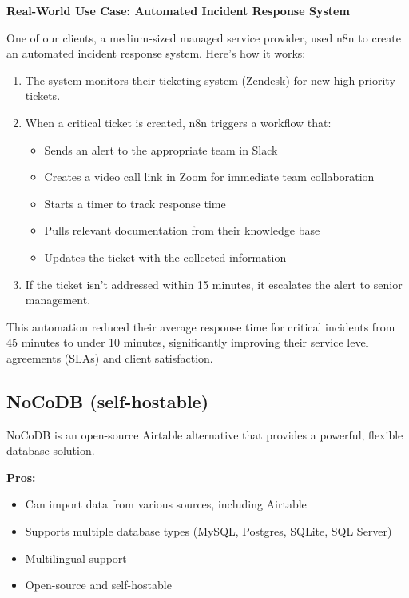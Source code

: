 \textbf{Real-World Use Case: Automated Incident Response System}

One of our clients, a medium-sized managed service provider, used n8n to create an automated incident response system. Here's how it works:

\begin{enumerate}
    \item The system monitors their ticketing system (Zendesk) for new high-priority tickets.
    \item When a critical ticket is created, n8n triggers a workflow that:
    \begin{itemize}
        \item Sends an alert to the appropriate team in Slack
        \item Creates a video call link in Zoom for immediate team collaboration
        \item Starts a timer to track response time
        \item Pulls relevant documentation from their knowledge base
        \item Updates the ticket with the collected information
    \end{itemize}
    \item If the ticket isn't addressed within 15 minutes, it escalates the alert to senior management.
\end{enumerate}

This automation reduced their average response time for critical incidents from 45 minutes to under 10 minutes, significantly improving their service level agreements (SLAs) and client satisfaction.

\subsection{NoCoDB (self-hostable)}

NoCoDB is an open-source Airtable alternative that provides a powerful, flexible database solution.

\textbf{Pros:}
\begin{itemize}
    \item Can import data from various sources, including Airtable
    \item Supports multiple database types (MySQL, Postgres, SQLite, SQL Server)
    \item Multilingual support
    \item Open-source and self-hostable
\end{itemize}

